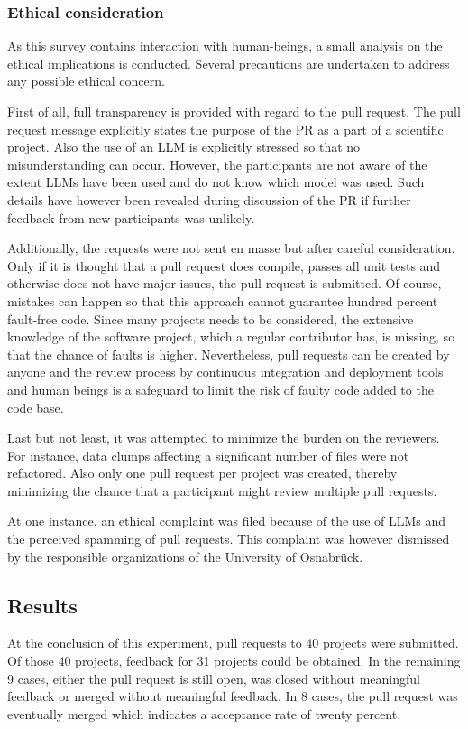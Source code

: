 \subsubsection{Ethical consideration}
As this survey contains interaction with human-beings, a small analysis on the ethical implications is conducted. Several precautions are undertaken to address any possible ethical concern. 

First of all, full transparency is provided  with regard to the pull request. The pull request message explicitly states the purpose of the \ac{PR} as a part of a scientific project. Also the use of an \ac{LLM} is explicitly stressed so that no misunderstanding can occur. However, the participants are not aware of the extent \acp{LLM} have been used and do not know which model was used. Such details have however been revealed during discussion of the \ac{PR} if further feedback from new participants was unlikely.

Additionally, the requests were not sent en masse but after careful consideration. Only if it is thought that a pull request does compile, passes all unit tests and otherwise does not have major issues, the pull request is submitted. Of course, mistakes can happen so that this approach cannot guarantee hundred percent fault-free code. Since many projects needs to be considered, the extensive knowledge of the software project, which a regular contributor has, is missing, so that the chance of faults is higher. Nevertheless, pull requests can be created by anyone and the review process by continuous integration and deployment tools and human beings is a safeguard to limit the risk of faulty code added to the code base. 

Last but not least, it was attempted to minimize the burden on the reviewers. For instance, data clumps affecting a significant number of files were not refactored. Also only one pull request per project was created, thereby minimizing the chance that a participant might review multiple pull requests. 

At one instance, an ethical complaint was filed because of the use of \acp{LLM} and the perceived spamming of pull requests. This complaint was however dismissed by the responsible organizations of the University of Osnabrück.


\subsection{Results}

At the conclusion of this experiment, pull requests to 40 projects were submitted. Of those 40 projects,  feedback for 31 projects could be obtained. In the remaining 9 cases, either the pull request is still open, was closed without meaningful feedback or merged without meaningful feedback. In 8 cases, the pull request was eventually merged which indicates a acceptance rate of twenty percent. 

